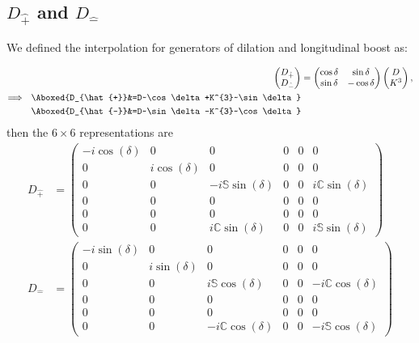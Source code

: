 \documentclass[]{article}
\numberwithin{equation}{section}
\begin{document}
{{\subsection{$D_{\hat{+}}$ and $D_{\hat{-}}$}
We defined the interpolation for generators of dilation and longitudinal boost as:

\begin{align}
\begin{pmatrix}
    D_{\hat{+}}\\
    D_{\hat{-}}
  \end{pmatrix}&=
  \begin{pmatrix}
    \cos\delta   & \sin\delta \\
    \sin\delta   & -\cos\delta
  \end{pmatrix}
  \begin{pmatrix}
    D\\
    K^{3}
  \end{pmatrix},\\
\Longrightarrow~~\Aboxed{D_{\hat{+}}&=D~\cos\delta+K^{3}~\sin\delta}\\
\Aboxed{D_{\hat{-}}&=D~\sin\delta-K^{3}~\cos\delta}
\end{align}
then the $6\times6$ representations are
\begin{align}
    D_{\hat{+}}&=\begin{pmatrix}
        -i\cos{(\delta)}&0&0&0&0&0\\
        0&i\cos{(\delta)}&0&0&0&0\\
        0&0&-i\mathbb{S}\sin{(\delta)}&0&0&i\mathbb{C}\sin{(\delta)}\\
        0&0&0&0&0&0\\
        0&0&0&0&0&0\\
        0&0&i\mathbb{C}\sin{(\delta)}&0&0&i\mathbb{S}\sin{(\delta)}
    \end{pmatrix}\\
    D_{\hat{-}}&=\begin{pmatrix}
        -i\sin{(\delta)}&0&0&0&0&0\\
        0&i\sin{(\delta)}&0&0&0&0\\
        0&0&i\mathbb{S}\cos{(\delta)}&0&0&-i\mathbb{C}\cos{(\delta)}\\
        0&0&0&0&0&0\\
        0&0&0&0&0&0\\
        0&0&-i\mathbb{C}\cos{(\delta)}&0&0&-i\mathbb{S}\cos{(\delta)}
    \end{pmatrix}
\end{align}

}}
\end{document}
